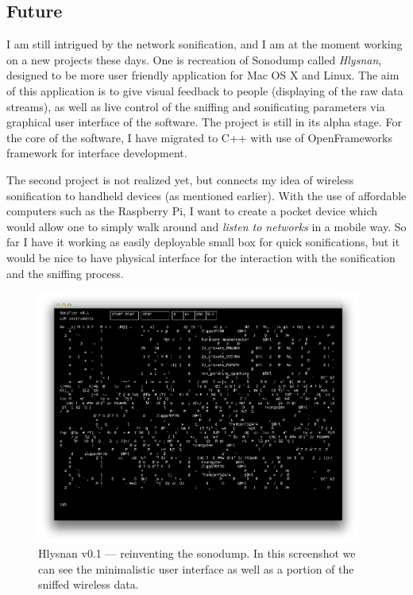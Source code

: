 \documentclass[12pt,a4paper,oneside]{report}
\begin{document}
\subsection{Future}
I am still intrigued by the network sonification, and I am at the moment working on a new projects these days. One is recreation of Sonodump called \textit{Hlysnan}, designed to be more user friendly application for Mac OS X and Linux. The aim of this application is to give visual feedback to people (displaying of the raw data streams), as well as live control of the sniffing and sonificating parameters via graphical user interface of the software. The project is still in its alpha stage. For the core of the software, I have migrated to C++ with use of OpenFrameworks framework for interface development.

The second project is not realized yet, but connects my idea of wireless sonification to handheld devices (as mentioned earlier). With the use of affordable computers such as the Raspberry Pi, I want to create a pocket device which would allow one to simply walk around and \emph{listen to networks} in a mobile way. So far I have it working as easily deployable small box for quick sonifications, but it would be nice to have physical interface for the interaction with the sonification and the sniffing process.

\begin{figure}  
  \centering
    \includegraphics[width=0.95\textwidth]{img/hlysnan}%
	\caption{Hlysnan v0.1 --- reinventing the sonodump. In this screenshot we can see the minimalistic user interface as well as a portion of the sniffed wireless data.}
	\label{fig:hlysnan}
\end{figure}
\end{document}
